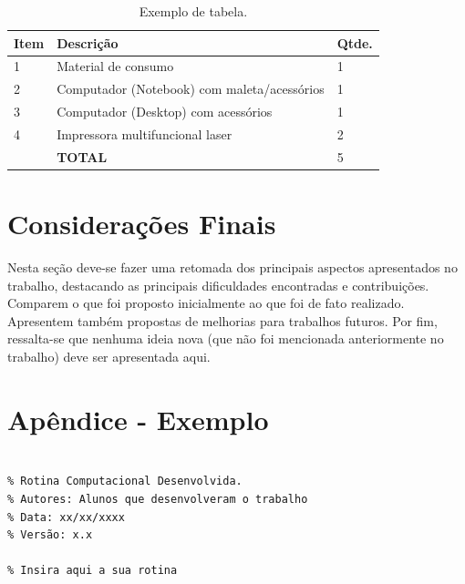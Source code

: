 \documentclass[12pt,titlepage]{article}
\begin{document}
\begin{table}[ht]
\centering
\caption{Exemplo de tabela.}
\begin{tabular}{l l l}
\toprule
Item & Descrição & Qtde. \\
\midrule
1 & Material de consumo & 1 \\
2 & Computador (Notebook) com maleta/acessórios & 1 \\
3 & Computador (Desktop) com acessórios & 1  \\
4 & Impressora multifuncional laser & 2  \\
\midrule
 & \textbf{TOTAL} & 5  \\
\bottomrule
\end{tabular}  
\label{tab:exemplo}
\end{table}



\section{Considerações Finais}
\label{sec:confin}

Nesta seção deve-se fazer uma retomada dos principais aspectos 
apresentados no trabalho, destacando as principais dificuldades 
encontradas e contribuições. Comparem o que foi proposto inicialmente 
ao que foi de fato realizado. Apresentem também propostas de melhorias para 
trabalhos futuros. Por fim, ressalta-se que nenhuma ideia nova (que não foi 
mencionada anteriormente no trabalho) deve ser apresentada aqui.




\newpage
\section*{Apêndice - Exemplo}
\label{sec:apend}

\begin{verbatim}

% Rotina Computacional Desenvolvida.
% Autores: Alunos que desenvolveram o trabalho
% Data: xx/xx/xxxx
% Versão: x.x

% Insira aqui a sua rotina

\end{verbatim}



\label{lastpage}
\end{document}
